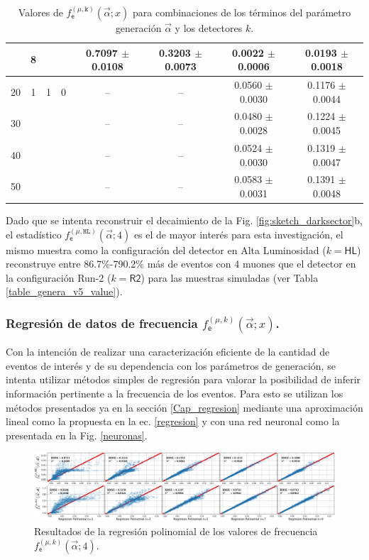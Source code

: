 \begin{table}[!t]
\begin{tabular}{|cccccccc|}
& 8 & & & 0.7097 $\pm$ 0.0108 & 0.3203 $\pm$ 0.0073 & 0.0022 $\pm$ 0.0006 & 0.0193 $\pm$ 0.0018\\
\hline
20 & 1 & 1 & 0 & -- & -- & 0.0560 $\pm$ 0.0030 & 0.1176 $\pm$ 0.0044 \\
30 & & & &  --  & -- & 0.0480 $\pm$ 0.0028 & 0.1224 $\pm$ 0.0045\\
40 & & & & -- & -- &  0.0524 $\pm$ 0.0030 &  0.1319 $\pm$ 0.0047 \\
50 & & & & -- & -- & 0.0583 $\pm$ 0.0031 & 0.1391 $\pm$ 0.0048 \\
\hline
\end{tabular}
\caption{Valores de $f^{(\mu, \texttt{k})}_\textsf{e} (\vec{\alpha}; x)$ para combinaciones de los términos del parámetro generación $\vec{\alpha}$ y los detectores $k$.}
\label{Numero_de_Entradas}
\end{table}

Dado que se intenta reconstruir el decaimiento de la Fig. \ref{fig:sketch_darksector}b, el estadístico $f^{(\mu, \texttt{HL})}_\textsf{e} (\vec{\alpha}; 4)$ es el de mayor interés para esta investigación, el mismo muestra como la configuración del detector en Alta Luminosidad ($k=\textsf{HL}$) reconstruye entre 86.7\%-790.2\% más de eventos con 4 muones que el detector en la configuración Run-2 ($k=\textsf{R2}$) para las muestras simuladas (ver Tabla \ref{table_genera_v5_value}).





\subsubsection{Regresión de datos de frecuencia $f^{(\mu, k)}_\textsf{e} (\vec{\alpha}; x)$.}

Con la intención de realizar una caracterización eficiente de la cantidad de eventos de interés y de su dependencia con los parámetros de generación, se intenta utilizar métodos simples de regresión para valorar la posibilidad de inferir información pertinente a la frecuencia de los eventos. Para esto se utilizan los métodos presentados ya en la sección \ref{Cap_regresion} mediante una aproximación lineal como la propuesta en la ec. \ref{regresion} y con una red neuronal como la presentada en la Fig. \ref{neuronas}.

\begin{figure}[!ht]
\centering
\includegraphics[width=1\textwidth]{Simulacion/imagenes/ML_Entries3.png}
\caption{Resultados de la regresión polinomial de los valores de frecuencia $f^{(\mu, k)}_\textsf{e} (\vec{\alpha}; 4)$.}
\label{regresionALL}
\end{figure}


